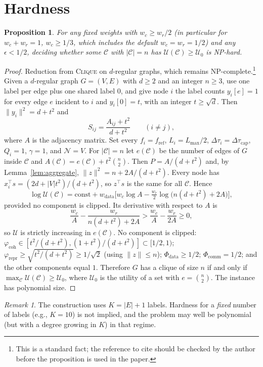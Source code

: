 \documentclass[10pt]{article}
\newtheorem{proposition}{Proposition}
\theoremstyle{remark}
\newtheorem{remark}{Remark}
\theoremstyle{definition}
\newcommand{\coh}{\varphi_{\text{coh}}}
\newcommand{\rep}{\varphi_{\text{repr}}}
\newcommand{\C}{\mathcal{C}}
\newcommand{\N}{\mathcal{N}}
\begin{document}
\section{Hardness}

\begin{proposition}\label{prop:hard}
For any fixed weights with $w_c \ge w_r/2$ (in particular for $w_c + w_r = 1$, $w_c \ge 1/3$, which includes the
default $w_c = w_r = 1/2$) and any $\epsilon < 1/2$, deciding whether some $\C$ with $|\C| = n$ has $\mathcal{U}(\C)
\ge \mathcal{U}_0$ is NP-hard.
\end{proposition}
\begin{proof}
Reduction from \textsc{Clique} on $d$-regular graphs, which remains NP-complete.\footnote{This is a standard fact;
the reference to cite should be checked by the author before the proposition is used in the paper.} Given a
$d$-regular graph $G = (V, E)$ with $d \ge 2$ and an integer $n \ge 3$, use one label per edge plus one shared label
$0$, and give node $i$ the label counts $y_i[e] = 1$ for every edge $e$ incident to $i$ and $y_i[0] = t$, with an
integer $t \ge \sqrt{d}$. Then $\|y_i\|^2 = d + t^2$ and
\[
S_{ij} = \frac{A_{ij} + t^2}{d + t^2} \qquad (i \ne j),
\]
where $A$ is the adjacency matrix. Set every $f_i = f_{\text{ref}}$, $L_i = L_{\max}/2$, $\Delta\tau_i =
\Delta\tau_{\text{cap}}$, $Q_i = 1$, $\gamma = 1$, and $\N = V$. For $|\C| = n$ let $e(\C)$ be the number of edges of
$G$ inside $\C$ and $A(\C) = e(\C) + t^2 \binom{n}{2}$. Then $P = A/(d+t^2)$ and, by Lemma~\ref{lem:aggregate},
$\|z\|^2 = n + 2A/(d+t^2)$. Every node has $x_i^\top s = (2d + |V| t^2)/(d+t^2)$, so $z^\top s$ is the same for all
$\C$. Hence
\[
\log \mathcal{U}(\C) = \text{const} + w_{\text{data}} \Big[ w_c \log A - \tfrac{w_r}{2} \log\big(n(d+t^2) + 2A\big)
\Big] ,
\]
provided no component is clipped. Its derivative with respect to $A$ is
\[
\frac{w_c}{A} - \frac{w_r}{n(d+t^2) + 2A} > \frac{w_c}{A} - \frac{w_r}{2A} \ge 0 ,
\]
so $\mathcal{U}$ is strictly increasing in $e(\C)$. No component is clipped: $\coh \in [t^2/(d+t^2), (1+t^2)/(d+t^2)]
\subset [1/2, 1)$; $\rep \ge \sqrt{t^2/(d+t^2)} \ge 1/\sqrt{2}$ (using $\|z\| \le n$); $\Phi_{\text{data}} \ge 1/2$;
$\Phi_{\text{comm}} = 1/2$; and the other components equal $1$. Therefore $G$ has a clique of size $n$ if and only if
$\max_\C \mathcal{U}(\C) \ge \mathcal{U}_0$, where $\mathcal{U}_0$ is the utility of a set with $e = \binom{n}{2}$.
The instance has polynomial size.
\end{proof}

\begin{remark}
The construction uses $K = |E| + 1$ labels. Hardness for a \emph{fixed} number of labels (e.g., $K = 10$) is not
implied, and the problem may well be polynomial (but with a degree growing in $K$) in that regime.
\end{remark}
\end{document}
